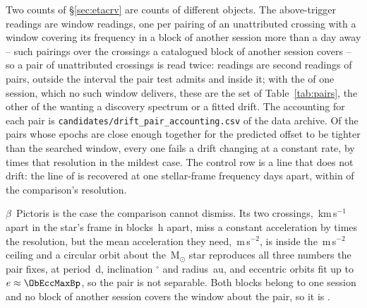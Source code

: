 Two counts of \S\ref{sec:etacrv} are counts of different objects. The
\WdNExc{} above-trigger readings are window readings, one per pairing of an
unattributed crossing with a window covering its frequency in a block of
another session more than a day away -- \WdNCov{} such pairings over the
\PaNCovWinCross{} crossings a catalogued block of another session covers -- so a pair of unattributed crossings is read twice:
\PaNPairTwice{} readings are second readings of \PaNPairRead{} pairs,
\PaNPairBeyond{} outside the interval the pair test admits and
\PaNPairInside{} inside it; with the \PaNPairSameSess{} of one session, which
no such window delivers, these are the set of Table~\ref{tab:pairs}, the other
\TjNCandLost{} of the \TjNCandPair{} wanting a discovery spectrum or a fitted
drift. The accounting for each pair is
\texttt{candidates/\allowbreak drift\_pair\_accounting.csv} of the data
archive. Of the \TjNPower{} pairs whose epochs are close enough together for
the predicted offset to be tighter than the searched window, every one fails
a drift changing at a constant rate, by \TjSigMin{} times that resolution in
the mildest case. The control row is a line that does not drift: the
\TjCtlLine{} line of \TjCtlStar{} is recovered at one stellar-frame frequency
\TjCtlDtD{} days apart, within \TjCtlNSig{} of the comparison's resolution.

$\beta$~Pictoris is the case the comparison cannot dismiss. Its two
crossings, \TjBpDvKms\,km\,s$^{-1}$ apart in the star's frame in blocks
\TjBpDtH\,h apart, miss a constant acceleration by \TjBpNSig{} times the
resolution, but the mean acceleration they need, \TjBpAccelReq\,m\,s$^{-2}$,
is inside the \WdAGrid\,m\,s$^{-2}$ ceiling and a circular orbit about the
\EcMassBp\,M$_\odot$ star \citep{Crifo1997} reproduces all three numbers the pair fixes, at period \ObDayBp\,d,
inclination \ObIncBp$^\circ$ and radius \ObAuBp\,au, and eccentric orbits fit up
to $e\approx\ObEccMaxBp$, so the pair is not separable. Both blocks belong to one session and no block of another session
covers the window about the pair, so it is \TjBpVerdict.


